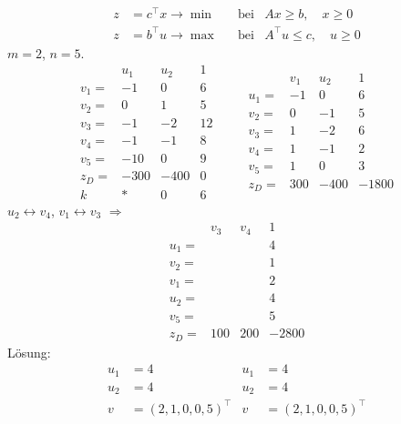 \begin{exmp}
  \begin{align*}
    z &= c^\top x \to \min & &\text{bei} & Ax \ge b, \quad x \ge 0 \tag{P} \\
    z &= b^\top u \to \max & &\text{bei} & A^\top u \le c, \quad u
                                              \ge 0 \tag{D}
  \end{align*}
  $m=2$, $n=5$.
  \[
    \begin{array}{r|ccc}
      & u_1 & u_2 & 1 \\
      \hline
      v_1 = & \boxed{-1} & 0 & 6 \\
      v_2 = & 0 & 1 & 5 \\
      v_3 = & -1 & -2 & 12 \\
      v_4 = & -1 & -1 & 8 \\
      v_5 = & -10 & 0 & 9 \\
      \hline
      z_D = & -300 & -400 & 0 \\
      \hline
      k & \ast & 0 & 6
    \end{array}
    \qquad
    \begin{array}{r|ccc}
      & v_1 & u_2 & 1 \\
      \hline
      u_1 = & -1 & 0 & 6 \\
      v_2 = & 0 & -1 & 5 \\
      v_3 = & 1 & -2 & 6 \\
      v_4 = & 1 & \boxed{-1} & 2 \\
      v_5 = & 1 & 0 & 3 \\
      \hline
      z_D = & 300 & -400 & -1800
    \end{array}
  \]
  $u_2 \leftrightarrow v_4$, $v_1 \leftrightarrow v_3$ $\Rightarrow$
  \[
    \begin{array}{r|ccc}
      & v_3 & v_4 & 1 \\
      \hline
      u_1 = & & & 4 \\
      v_2 = & & & 1 \\
      v_1 = & & & 2 \\
      u_2 = & & & 4 \\
      v_5 = & & & 5 \\
      \hline
      z_D = & 100 & 200 & -2800
    \end{array}
  \]
  Lösung:
  \begin{align*}
    u_1 &= 4 & u_1 &= 4 \\
    u_2 &= 4 & u_2 &= 4 \\
    v &= (2, 1, 0, 0, 5)^\top & v &= (2, 1, 0, 0, 5)^\top
  \end{align*}
\end{exmp}

